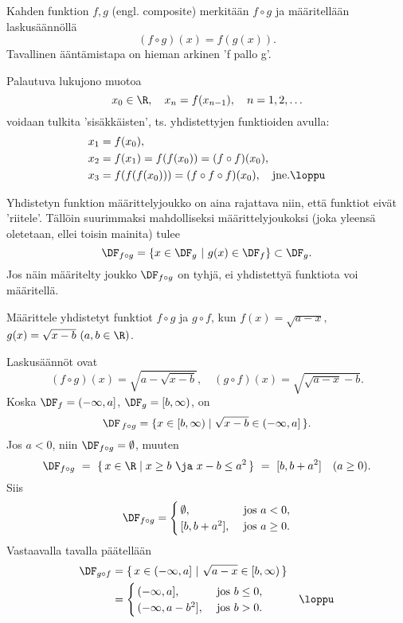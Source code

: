 Kahden funktion $f,g$  (engl. composite)  merkitään
$f \circ g$ ja määritellään laskusäännöllä
\[
(f \circ g)(x)=f(g(x)).
\]
Tavallinen ääntämistapa on hieman arkinen 'f pallo g'. 
\begin{Exa}
Palautuva lukujono muotoa
\[
x_0 \in \R, \quad x_n=f(x_{n-1}), \quad n=1,2,\ldots
\]
voidaan tulkita 'sisäkkäisten', ts. yhdistettyjen funktioiden avulla:
\begin{align*}
x_1 &= f(x_0), \\ 
x_2 &= f(x_1) = f(f(x_0))=(f \circ f)(x_0), \\
x_3 &= f(f(f(x_0)))=(f \circ f \circ f)(x_0), \quad \text{jne.} \loppu
\end{align*}
\end{Exa}
Yhdistetyn funktion määrittelyjoukko on aina rajattava niin, että funktiot eivät 'riitele'.
Tällöin suurimmaksi mahdolliseksi määrittelyjoukoksi (joka yleensä oletetaan, ellei toisin 
mainita) tulee
\[
\DF_{f\circ g}=\{x \in \DF_g \ | \ g(x) \in \DF_f\} \subset \DF_g.
\]
Jos näin määritelty joukko $\DF_{f \circ g}$ on tyhjä, ei yhdistettyä funktiota voi määritellä.
\begin{Exa} Määrittele yhdistetyt funktiot $f \circ g$ ja $g \circ f$, kun 
$f(x)=\sqrt{a-x},\quad$ $g(x)=\sqrt{x-b}\ (a,b\in\R)$. \end{Exa}
\ratk Laskusäännöt ovat
\[
(f\circ g)(x) = \sqrt{a-\sqrt{x-b}}, \quad (g\circ f)(x) = \sqrt{\sqrt{a-x}-b}.
\]
Koska $\DF_f=(-\infty,a]$, $\DF_g=[b,\infty)$, on
\[
\DF_{\,f \circ g}=\{x \in [b,\infty) \mid \sqrt{x-b} \in (-\infty,a]\,\}.
\]
Jos $a<0$, niin $\DF_{f\circ g}=\emptyset$, muuten
\[
\DF_{f\circ g}\ =\ \{\,x\in\R \mid x \geq b \ \ja \ x-b \leq a^2\,\}\ 
                =\ [b,b+a^2] \quad (a \geq 0).
\]
Siis
\[
\DF_{f\circ g}=\begin{cases}
               \,\emptyset, &\text{ jos } a <0, \\
               \,[b,b+a^2], &\text{ jos } a \geq 0.
               \end{cases}
\]
Vastaavalla tavalla päätellään
\begin{align*}
\DF_{g\circ f}&=\{\,x\in (-\infty,a] \ | \ \sqrt{a-x} \in [b,\infty)\,\} \\
              &=\begin{cases}
                \,(-\infty,a],     &\text{ jos } b \le 0, \\
                \,(-\infty,a-b^2], &\text{ jos } b > 0.
                \end{cases} \qquad\quad \loppu
\end{align*}

